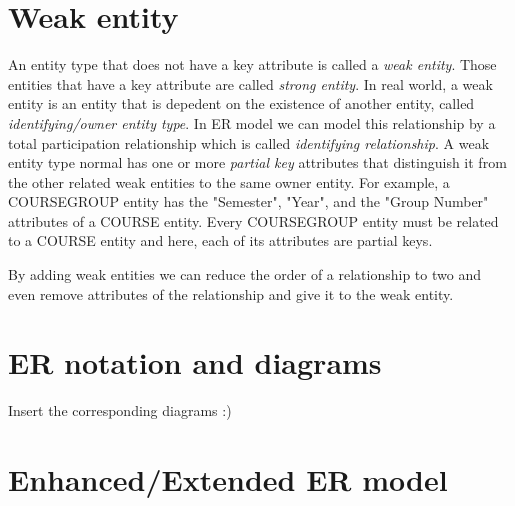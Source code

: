 \section{Weak entity}
An entity type that does not have a key attribute is called a \textit{weak entity}. Those entities that have a key attribute are called \textit{strong entity}. In real world, a weak entity is an entity that is depedent on the existence of another entity, called \textit{identifying/owner entity type}. In ER model we can model this relationship by a total participation relationship which is called \textit{identifying relationship}. A weak entity type normal has one or more \textit{partial key} attributes that distinguish it from the other related weak entities to the same owner entity. For example, a COURSEGROUP entity has the "Semester", "Year", and the "Group Number" attributes of a COURSE entity. Every COURSEGROUP entity must be related to a COURSE entity and here, each of its attributes are partial keys.

By adding weak entities we can reduce the order of a relationship to two and even remove attributes of the relationship and give it to the weak entity.

\section{ER notation and diagrams}
Insert the corresponding diagrams :)

\section{Enhanced/Extended ER model}
